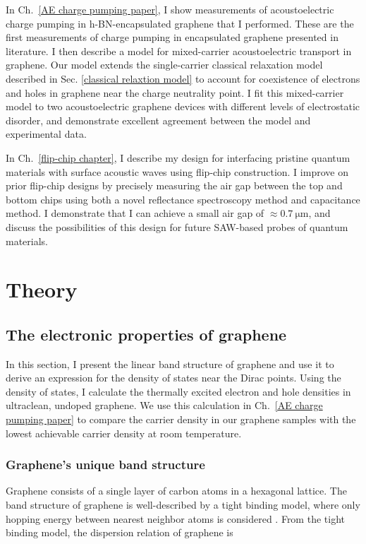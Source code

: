 \documentclass[double,12pt,1in,seploa]{beavtex}
\let\Oldsection\section
\renewcommand{\section}{\FloatBarrier\Oldsection}
\let\Oldsubsection\subsection
\renewcommand{\subsection}{\FloatBarrier\Oldsubsection}
\begin{document}
In Ch.\ \ref{AE charge pumping paper}, I show measurements of acoustoelectric charge pumping in h-BN-encapsulated graphene that I performed. These are the first measurements of charge pumping in encapsulated graphene presented in literature. I then describe a model for mixed-carrier acoustoelectric transport in graphene. Our model extends the single-carrier classical relaxation model described in Sec. \ref{classical relaxtion model} to account for coexistence of electrons and holes in graphene near the charge neutrality point. I fit this mixed-carrier model to two acoustoelectric graphene devices with different levels of electrostatic disorder, and demonstrate excellent agreement between the model and experimental data.

In Ch.\ \ref{flip-chip chapter}, I describe my design for interfacing pristine quantum materials with surface acoustic waves using flip-chip construction. I improve on prior flip-chip designs by precisely measuring the air gap between the top and bottom chips using both a novel reflectance spectroscopy method and capacitance method. I demonstrate that I can achieve a small air gap of $\approx \SI{0.7}{\micro\meter}$, and discuss the possibilities of this design for future SAW-based probes of quantum materials.


\chapter{Theory}

\section{The electronic properties of graphene} \label{the electronic properties of graphene}
In this section, I present the linear band structure of graphene and use it to derive an expression for the density of states near the Dirac points. Using the density of states, I calculate the thermally excited electron and hole densities in ultraclean, undoped graphene. We use this calculation in Ch.\ \ref{AE charge pumping paper} to compare the carrier density in our graphene samples with the lowest achievable carrier density at room temperature.

\subsection{Graphene's unique band structure}

Graphene consists of a single layer of carbon atoms in a hexagonal lattice. The band structure of graphene is well-described by a tight binding model, where only hopping energy between nearest neighbor atoms is considered \cite{wallace_band_1947}. From the tight binding model, the dispersion relation of graphene is 
\end{document}
